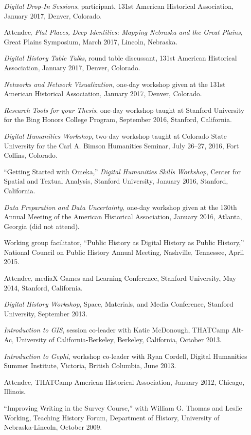 \emph{Digital Drop-In Sessions}, participant, 131st American Historical
Association, January 2017, Denver, Colorado.

Attendee, \emph{Flat Places, Deep Identities: Mapping Nebraska and the
Great Plains}, Great Plains Symposium, March 2017, Lincoln, Nebraska.

\emph{Digital History Table Talks}, round table discussant, 131st
American Historical Association, January 2017, Denver, Colorado.

\emph{Networks and Network Visualization}, one-day workshop given at the
131st American Historical Association, January 2017, Denver, Colorado.

\emph{Research Tools for your Thesis}, one-day workshop taught at
Stanford University for the Bing Honors College Program, September 2016,
Stanford, California.

\emph{Digital Humanities Workshop}, two-day workshop taught at Colorado
State University for the Carl A. Bimson Humanities Seminar, July 26--27,
2016, Fort Collins, Colorado.

``Getting Started with Omeka,'' \emph{Digital Humanities Skills
Workshop}, Center for Spatial and Textual Analysis, Stanford University,
January 2016, Stanford, California.

\emph{Data Preparation and Data Uncertainty}, one-day workshop given at
the 130th Annual Meeting of the American Historical Association, January
2016, Atlanta, Georgia (did not attend).

Working group facilitator, ``Public History as Digital History as Public
History,'' National Council on Public History Annual Meeting, Nashville,
Tennessee, April 2015.

Attendee, mediaX Games and Learning Conference, Stanford University, May
2014, Stanford, California.

\emph{Digital History Workshop}, Space, Materials, and Media Conference,
Stanford University, September 2013.

\emph{Introduction to GIS}, session co-leader with Katie McDonough,
THATCamp Alt-Ac, University of California-Berkeley, Berkeley,
California, October 2013.

\emph{Introduction to Gephi}, workshop co-leader with Ryan Cordell,
Digital Humanities Summer Institute, Victoria, British Columbia, June
2013.

Attendee, THATCamp American Historical Association, January 2012,
Chicago, Illinois.

``Improving Writing in the Survey Course,'' with William G. Thomas and
Leslie Working, Teaching History Forum, Department of History,
University of Nebraska-Lincoln, October 2009.

